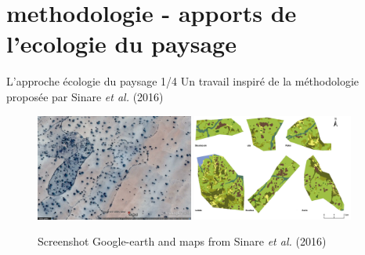 \documentclass[newPxFont]{beamer}
\begin{document}
\section{methodologie - apports de l'ecologie du paysage}

\begin{frame}[c]{L'approche écologie du paysage 1/4}
\vspace{-1cm}
Un travail inspiré de la méthodologie proposée par Sinare \textit{et al.} (2016)
\begin{figure}
	\centering
	\includegraphics[height = 3.5cm]{img/ggearth}
  \includegraphics[height = 3.5cm]{img/Sinare_et_al2016}
  \caption{\small{Screenshot Google-earth and maps from Sinare \textit{et al.} (2016)}}
\end{figure}
\end{frame}

\end{document}
